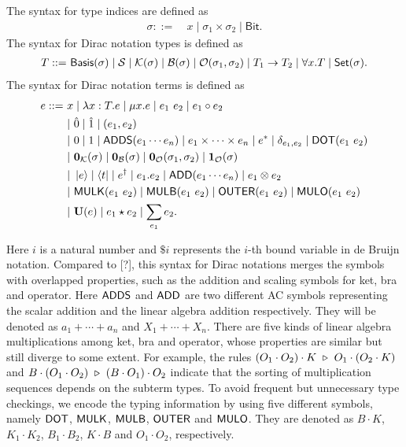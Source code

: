 \documentclass[runningheads]{llncs}
\begin{document}
\begin{definition}
    The syntax for type indices are defined as
    \begin{align*}
        \sigma ::=\ & x \mid \sigma_1 \times \sigma_2 \mid \mathsf{Bit}.
    \end{align*}
    The syntax for Dirac notation types is defined as 
    \begin{align*}
        T ::=\ & \mathsf{Basis}(\sigma) \mid \mathcal{S} \mid \mathcal{K}(\sigma) \mid \mathcal{B}(\sigma) \mid \mathcal{O}(\sigma_1, \sigma_2) \mid T_1 \to T_2 \mid \forall x.T \mid \mathsf{Set}(\sigma). \\
    \end{align*}
    The syntax for Dirac notation terms is defined as
    \begin{align*}
        e ::=\ & x \mid \lambda x : T.e \mid \mu x.e \mid e_1\ e_2 \mid e_1 \circ e_2 \\
        & |\ \hat{0} \mid \hat{1} \mid (e_1, e_2) \\
        & |\ 0 \mid 1 \mid \ADDS(e_1 \cdots e_n)  \mid e_1 \times \cdots \times e_n \mid e^*  \mid \delta_{e_1, e_2} \mid \DOT(e_1\ e_2) \\
        & |\ \ZEROK(\sigma) \mid \ZEROB(\sigma) \mid \ZEROO(\sigma_1, \sigma_2) \mid \ONEO(\sigma) \\
        & |\ \ket{e} \mid \bra{t} \mid e^\dagger \mid e_1.e_2 \mid \ADD(e_1 \cdots e_n) \mid e_1 \otimes e_2 \\
        & |\ \MULK(e_1\ e_2) \mid \MULB(e_1\ e_2) \mid \OUTER(e_1\ e_2) \mid \MULO(e_1\ e_2) \\
        & |\ \mathbf{U}(e) \mid e_1 \star e_2 \mid \sum_{e_1} e_2.
    \end{align*}
\end{definition}
Here $i$ is a natural number and $\$i$ represents the $i$-th bound variable in de Bruijn notation. 
Compared to [?], this syntax for Dirac notations merges the symbols with overlapped properties, such as the addition and scaling symbols for ket, bra and operator.
Here $\mathsf{ADDS}$ and $\mathsf{ADD}$ are two different AC symbols representing the scalar addition and the linear algebra addition respectively. They will be denoted as $a_1 + \cdots + a_n$ and $X_1 + \cdots + X_n$.
There are five kinds of linear algebra multiplications among ket, bra and operator, whose properties are similar but still diverge to some extent. For example, the rules $(O_1 \cdot O_2) \cdot K\ \triangleright\ O_1 \cdot (O_2 \cdot K)$ and $B \cdot (O_1 \cdot O_2) \ \triangleright\ (B \cdot O_1) \cdot O_2$ indicate that the sorting of multiplication sequences depends on the subterm types. To avoid frequent but unnecessary type checkings, we encode the typing information by using five different symbols, namely $\mathsf{DOT}$, $\mathsf{MULK}$, $\mathsf{MULB}$, $\mathsf{OUTER}$ and $\mathsf{MULO}$. They are denoted as $B\cdot K$, $K_1 \cdot K_2$, $B_1 \cdot B_2$, $K \cdot B$ and $O_1 \cdot O_2$, respectively.
\end{document}
